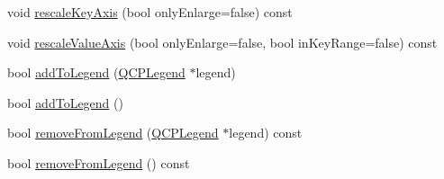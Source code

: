 \begin{DoxyCompactItemize}
\item 
void \mbox{\hyperlink{class_q_c_p_abstract_plottable_ae96b83c961e257da116c6acf9c7da308}{rescale\+Key\+Axis}} (bool only\+Enlarge=false) const
\item 
void \mbox{\hyperlink{class_q_c_p_abstract_plottable_a714eaf36b12434cd71846215504db82e}{rescale\+Value\+Axis}} (bool only\+Enlarge=false, bool in\+Key\+Range=false) const
\item 
bool \mbox{\hyperlink{class_q_c_p_abstract_plottable_aa64e93cb5b606d8110d2cc0a349bb30f}{add\+To\+Legend}} (\mbox{\hyperlink{class_q_c_p_legend}{Q\+C\+P\+Legend}} $\ast$legend)
\item 
bool \mbox{\hyperlink{class_q_c_p_abstract_plottable_a70f8cabfd808f7d5204b9f18c45c13f5}{add\+To\+Legend}} ()
\item 
bool \mbox{\hyperlink{class_q_c_p_abstract_plottable_a3cc235007e2343a65ad4f463767e0e20}{remove\+From\+Legend}} (\mbox{\hyperlink{class_q_c_p_legend}{Q\+C\+P\+Legend}} $\ast$legend) const
\item 
bool \mbox{\hyperlink{class_q_c_p_abstract_plottable_ac95fb2604d9106d0852ad9ceb326fe8c}{remove\+From\+Legend}} () const
\end{DoxyCompactItemize}
